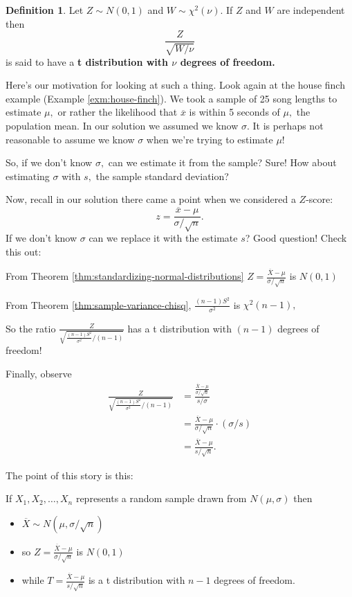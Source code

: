\documentclass[
]{book}
\providecommand{\tightlist}{%
  \setlength{\itemsep}{0pt}\setlength{\parskip}{0pt}}
\theoremstyle{definition}
\newtheorem{definition}{Definition}[chapter]
\theoremstyle{definition}
\theoremstyle{definition}
\theoremstyle{definition}
\theoremstyle{remark}
\begin{document}
\begin{definition}
\protect\hypertarget{def:t-distribution}{}\label{def:t-distribution}Let \(Z \sim N(0,1)\) and \(W \sim \chi^2(\nu)\). If \(Z\) and \(W\) are independent then \[\frac{Z}{\sqrt{W/\nu}}\] is said to have a \textbf{t distribution with \(\nu\) degrees of freedom.}
\end{definition}

Here's our motivation for looking at such a thing. Look again at the house finch example (Example \ref{exm:house-finch}). We took a sample of 25 song lengths to estimate \(\mu,\) or rather the likelihood that \(\overline{x}\) is within 5 seconds of \(\mu,\) the population mean. In our solution we assumed we know \(\sigma\). It is perhaps not reasonable to assume we know \(\sigma\) when we're trying to estimate \(\mu\)!

So, if we don't know \(\sigma,\) can we estimate it from the sample? Sure! How about estimating \(\sigma\) with \(s,\) the sample standard deviation?

Now, recall in our solution there came a point when we considered a \(Z\)-score:
\[z = \frac{\overline{x}-\mu}{\sigma/\sqrt{n}}.\]
If we don't know \(\sigma\) can we replace it with the estimate \(s\)?
Good question! Check this out:

From Theorem \ref{thm:standardizing-normal-distributions} \(\displaystyle Z =\frac{ \overline{X}-\mu}{\sigma/\sqrt{n}}\) is \(N(0,1)\)

From Theorem \ref{thm:sample-variance-chisq}, \(\displaystyle\frac{(n-1)S^2}{\sigma^2}\) is \(\chi^2(n-1),\)

So the ratio \(\displaystyle\frac{Z}{\sqrt{\frac{(n-1)S^2}{\sigma^2}\big/(n-1)}}\) has a t distribution with \((n-1)\) degrees of freedom!

Finally, observe
\begin{align*}
  \frac{Z}{\sqrt{\frac{(n-1)S^2}{\sigma^2}\big/(n-1)}} &= \frac{\frac{\overline{X}-\mu}{\sigma/\sqrt{n}}}{s/\sigma} \\
  &= \frac{\overline{X}-\mu}{\sigma/\sqrt{n}} \cdot (\sigma/s) \\
  &= \frac{\overline{X}-\mu}{s/\sqrt{n}}.
\end{align*}

The point of this story is this:

If \(X_1,X_2,\ldots, X_n\) represents a random sample drawn from \(N(\mu,\sigma)\) then

\begin{itemize}
\tightlist
\item
  \(\displaystyle \overline{X} \sim N(\mu,\sigma/\sqrt{n})\)
\item
  so \(\displaystyle Z = \frac{\overline{X}-\mu}{\sigma/\sqrt{n}}\) is \(N(0,1)\)
\item
  while \(\displaystyle T = \frac{\overline{X}-\mu}{s/\sqrt{n}}\) is a t distribution with \(n-1\) degrees of freedom.
\end{itemize}
\end{document}
